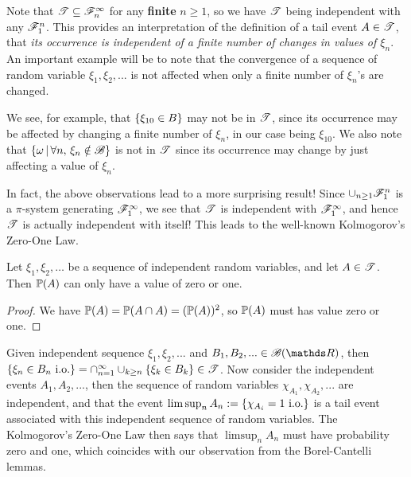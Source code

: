 Note that $\mathcal{T} \subseteq \mathcal{F}_n^\infty$ for any \textbf{finite} $n \geq 1$, so we have $\mathcal{T}$ being independent with any $\mathcal{F}_1^n$. This provides an interpretation of the definition of a tail event $A \in \mathcal{T}$, that \textit{its occurrence is independent of a finite number of changes in values of $\xi_n$}. An important example will be to note that the convergence of a sequence of random variable $\xi_1, \xi_2, ...$ is not affected when only a finite number of $\xi_n$'s are changed. 

\begin{example}
We see, for example, that $\left\{ \xi_{10} \in B \right \}$ may not be in $\mathcal{T}$, since its occurrence may be affected by changing a finite number of $\xi_n$, in our case being $\xi_{10}$. We also note that $\left\{ \omega \,|\, \forall n, \, \xi_n \notin \mathcal{B} \right \}$ is not in $\mathcal{T}$ since its occurrence may change by just affecting a value of $\xi_n$.
\end{example}

In fact, the above observations lead to a more surprising result! Since $\cup_{n\geq 1} \mathcal{F}_1^n$ is a $\pi$-system generating $\mathcal{F}_1^\infty$, we see that $\mathcal{T}$ is independent with $\mathcal{F}_1^\infty$, and hence $\mathcal{T}$ is actually independent with itself! This leads to the well-known Kolmogorov's Zero-One Law.

\begin{theorem}
Let $\xi_1, \xi_2, \dots$ be a sequence of independent random variables, and let $A \in \mathcal{T}$. Then $\mathbb{P}(A)$ can only have a value of zero or one.
\end{theorem}

\begin{proof}
We have $\mathbb{P}(A) = \mathbb{P}(A \cap A) = (\mathbb{P}(A))^2$, so $\mathbb{P}(A)$ must has value zero or one. 
\end{proof}

\begin{example}
Given independent sequence $\xi_1, \xi_2, ...$ and $B_1, B_2, ... \in \B(\R)$, then $\left\{ \xi_n \in B_n \text{ i.o.} \right \} = \cap_{n=1}^\infty \cup_{k\geq n} \left\{ \xi_k \in B_k \right \} \in \mathcal{T}$. Now consider the independent events $A_1, A_2, ...$, then the sequence of random variables $\chi_{A_1}, \chi_{A_2}, ...$ are independent, and that the event $\limsup_{n} A_n := \left\{ \chi_{A_i} = 1 \text{ i.o.} \right \}$ is a tail event associated with this independent sequence of random variables. The Kolmogorov's Zero-One Law then says that $\limsup_{n} A_n$ must have probability zero and one, which coincides with our observation from the Borel-Cantelli lemmas.
\end{example}

